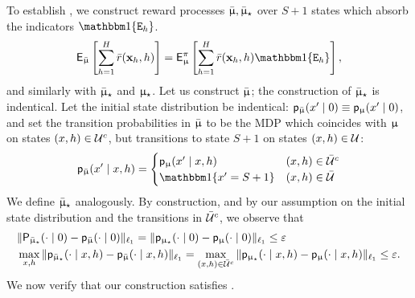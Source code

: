 	To establish , we construct reward processes  $\bar{\upmu},\bar{\upmu}_{\star}$ over $S+1$ states which absorb the indicators $\ind\{\scrE_h\}$.
	\begin{align}\label{eq:equal_expectation}
	\sfE_{\barmod}\left[\sum_{h=1}^H \rbar(\bmx_h,h)\right] =
	\sfE^{\pi}_{\model}\left[\sum_{h=1}^H \rbar(\bmx_h,h) \ind\{\scrE_h\}\right],
	\end{align}
	and similarly with $\bar{\upmu}_{\star}$ and $\upmu_{\star}$. Let us construct $\bar{\upmu}$; the construction of $\bar{\upmu}_{\star}$ is indentical.
	Let the initial state distribution be indentical: $\mathsf{p}_{\bar{\upmu}}(x' \mid 0) \equiv \mathsf{p}_{\upmu}(x' \mid 0)$, and set the transition probabilities in $\bar{\upmu}$ to be the MDP which coincides with $\upmu$ on states $(x,h) \in \mathcal{U}^c$, but transitions to state $S+1$ on states $(x,h) \in \mathcal{U}$:
	\begin{align*}
	\sfp_{\barmod}(x' \mid x,h) = \begin{cases} \sfp_{\model}(x' \mid x,h) & (x,h) \in \calUbar^c \\
	  \ind\{x' = S+1\} & (x,h) \in \calUbar \\
	\end{cases}
	\end{align*}
	We define $\bar{\upmu}_{\star}$ analogously. By construction, and by our assumption on the initial state distribution and the transitions in $\bar{\mathcal{U}}^c$, we observe that
	\begin{align}
	&\|\mathsf{P}_{\bar{\upmu}_{\star}}(\cdot \mid 0) - \mathsf{p}_{\bar{\upmu}}(\cdot \mid 0)\|_{\ell_1} = \|\mathsf{p}_{\upmu_{\star}}(\cdot \mid 0) - \mathsf{p}_{\upmu}(\cdot \mid 0)\|_{\ell_1} \le \varepsilon \label{eq:close_init_dist}\\
	&\max_{x,h}\|\mathsf{p}_{\bar{\upmu}_{\star}}(\cdot \mid x,h) - \mathsf{p}_{\bar{\upmu}}(\cdot \mid x,h)\|_{\ell_1} = \max_{(x,h) \in \bar{\mathcal{U}}^c}\|\mathsf{p}_{\upmu_{\star}}(\cdot \mid x,h) - \mathsf{p}_{\upmu}(\cdot \mid x,h)\|_{\ell_1} \le \varepsilon.\label{eq:close_trans_dist}
	\end{align}
	We now verify that our construction satisfies .

